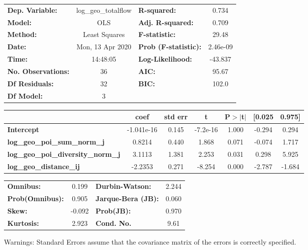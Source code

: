 \begin{center}
\begin{tabular}{lclc}
\toprule
\textbf{Dep. Variable:}                    & log\_geo\_totalflow & \textbf{  R-squared:         } &     0.734   \\
\textbf{Model:}                            &         OLS         & \textbf{  Adj. R-squared:    } &     0.709   \\
\textbf{Method:}                           &    Least Squares    & \textbf{  F-statistic:       } &     29.48   \\
\textbf{Date:}                             &   Mon, 13 Apr 2020  & \textbf{  Prob (F-statistic):} &  2.46e-09   \\
\textbf{Time:}                             &       14:48:05      & \textbf{  Log-Likelihood:    } &   -43.837   \\
\textbf{No. Observations:}                 &            36       & \textbf{  AIC:               } &     95.67   \\
\textbf{Df Residuals:}                     &            32       & \textbf{  BIC:               } &     102.0   \\
\textbf{Df Model:}                         &             3       & \textbf{                     } &             \\
\bottomrule
\end{tabular}
\begin{tabular}{lcccccc}
                                           & \textbf{coef} & \textbf{std err} & \textbf{t} & \textbf{P$> |$t$|$} & \textbf{[0.025} & \textbf{0.975]}  \\
\midrule
\textbf{Intercept}                         &   -1.041e-16  &        0.145     &  -7.2e-16  &         1.000        &       -0.294    &        0.294     \\
\textbf{log\_geo\_poi\_sum\_norm\_j}       &       0.8214  &        0.440     &     1.868  &         0.071        &       -0.074    &        1.717     \\
\textbf{log\_geo\_poi\_diversity\_norm\_j} &       3.1113  &        1.381     &     2.253  &         0.031        &        0.298    &        5.925     \\
\textbf{log\_geo\_distance\_ij}            &      -2.2353  &        0.271     &    -8.254  &         0.000        &       -2.787    &       -1.684     \\
\bottomrule
\end{tabular}
\begin{tabular}{lclc}
\textbf{Omnibus:}       &  0.199 & \textbf{  Durbin-Watson:     } &    2.244  \\
\textbf{Prob(Omnibus):} &  0.905 & \textbf{  Jarque-Bera (JB):  } &    0.060  \\
\textbf{Skew:}          & -0.092 & \textbf{  Prob(JB):          } &    0.970  \\
\textbf{Kurtosis:}      &  2.923 & \textbf{  Cond. No.          } &     9.61  \\
\bottomrule
\end{tabular}
\end{center}

Warnings: \newline
 [1] Standard Errors assume that the covariance matrix of the errors is correctly specified.